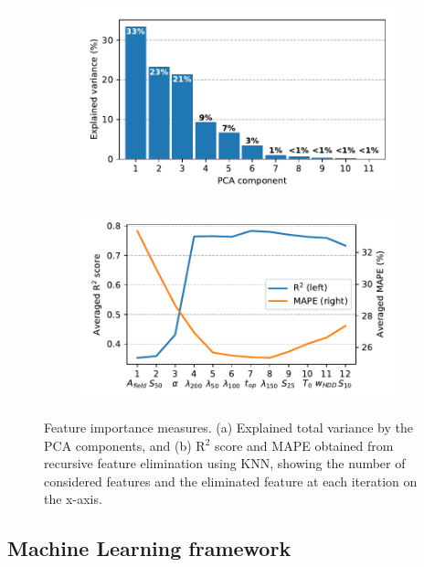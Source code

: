 \begin{figure}[b]
\centering
\begin{subfigure}{.49\textwidth}
  \centering
  \includegraphics[width=\linewidth]{images/Figs/PCA_variance.pdf}
  \subcaption{}
  \label{fig:geo_ML_PCA}
\end{subfigure}
\begin{subfigure}{.49\textwidth}
  \centering
  \includegraphics[width=\linewidth]{images/Figs/RFE.pdf}  
  \subcaption{}
  \label{fig:geo_ML_RFE}
\end{subfigure}
\caption{Feature importance measures. (a) Explained total variance by the PCA components, and (b) R$^2$ score and MAPE obtained from recursive feature elimination using KNN, showing the number of considered features and the eliminated feature at each iteration on the x-axis.}
\label{fig:geo_ML_ftrs}
\end{figure}

\subsection{Machine Learning framework}
\label{geo_ML_model}

